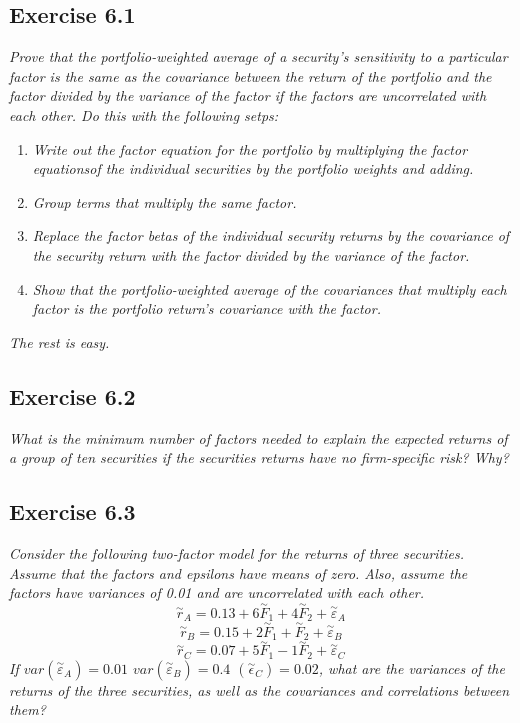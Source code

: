 \documentclass[]{book}
\theoremstyle{definition}
\theoremstyle{definition}
\theoremstyle{remark}
\begin{document}
\subsection{Exercise 6.1}\label{exercise-6.1}

\emph{Prove that the portfolio-weighted average of a security's
sensitivity to a particular factor is the same as the covariance between
the return of the portfolio and the factor divided by the variance of
the factor if the factors are uncorrelated with each other. Do this with
the following setps:} \citep[p.197]{book}

\begin{enumerate}
\def\labelenumi{\arabic{enumi}.}
\item
  \emph{Write out the factor equation for the portfolio by multiplying
  the factor equationsof the individual securities by the portfolio
  weights and adding.} \citep[p.198]{book}
\item
  \emph{Group terms that multiply the same factor.} \citep[p.198]{book}
\item
  \emph{Replace the factor betas of the individual security returns by
  the covariance of the security return with the factor divided by the
  variance of the factor.} \citep[p.198]{book}
\item
  \emph{Show that the portfolio-weighted average of the covariances that
  multiply each factor is the portfolio return's covariance with the
  factor.} \citep[p.198]{book}
\end{enumerate}

\emph{The rest is easy.} \citep[p.198]{book}

\subsection{Exercise 6.2}\label{exercise-6.2}

\emph{What is the minimum number of factors needed to explain the
expected returns of a group of ten securities if the securities returns
have no firm-specific risk? Why?} \citep[p.198]{book}

\subsection{Exercise 6.3}\label{exercise-6.3}

\emph{Consider the following two-factor model for the returns of three
securities. Assume that the factors and epsilons have means of zero.
Also, assume the factors have variances of 0.01 and are uncorrelated
with each other.} \citep[p.198]{book}
\[\overset{\sim}{r}_A=0.13+6\overset{\sim}{F}_1+4\overset{\sim}{F}_2+\overset{\sim}{\varepsilon}_A\]
\[\overset{\sim}{r}_B=0.15+2\overset{\sim}{F}_1+\overset{\sim}{F}_2+\overset{\sim}{\varepsilon}_B\]
\[\overset{\sim}{r}_C=0.07+5\overset{\sim}{F}_1-1\overset{\sim}{F}_2+\overset{\sim}{\varepsilon}_C\]
\emph{If \(var\left(\overset{\sim}{\varepsilon}_A\right)=0.01\)
\(var\left(\overset{\sim}{\varepsilon}_B\right)=0.4\)
\(\left(\overset{\sim}{\epsilon}_C\right)=0.02\), what are the variances
of the returns of the three securities, as well as the covariances and
correlations between them?} \citep[p.198]{book}
\end{document}
